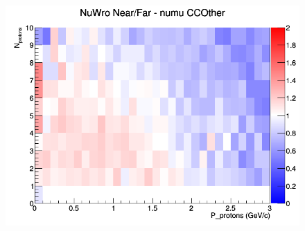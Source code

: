 \begin{figure}[h]
\endminipage
{}
\includegraphics[width=\linewidth]{N_P/nominal/protons/ratios/CCOther_NuWro_numu_NF_N_P.png}
\endminipage
\newline
\end{figure}
\clearpage
